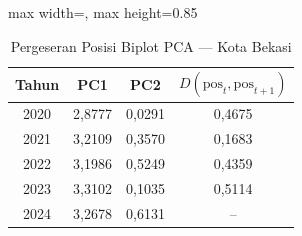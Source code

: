 \begin{table}[H]
\centering
\caption{Pergeseran Posisi Biplot PCA --- Kota Bekasi} \label{tab:appjarak_pca_skor_kota_bekasi}
\begin{adjustbox}{max width=\textwidth, max height=0.85\textheight}
\begin{tabular}{|c|c|c|c|}
\hline
\textbf{Tahun} & \textbf{PC1} & \textbf{PC2} & \textbf{$D(\text{pos}_t, \text{pos}_{t+1})$} \\
\hline
2020 & 2,8777 & 0,0291 & 0,4675 \\
2021 & 3,2109 & 0,3570 & 0,1683 \\
2022 & 3,1986 & 0,5249 & 0,4359 \\
2023 & 3,3102 & 0,1035 & 0,5114 \\
2024 & 3,2678 & 0,6131 & -- \\
\hline
\end{tabular}
\end{adjustbox}
\end{table}
